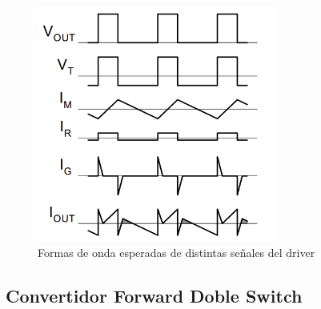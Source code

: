 \begin{figure}[H]
    \centering
    \includegraphics[width=0.7\textwidth]{images/driver_expected_waveforms.png}
    \caption{Formas de onda esperadas de distintas señales del driver \cite{gatedrivers}}
    \label{fig:driver_expected_waveforms}
\end{figure}













\subsection{Convertidor Forward Doble Switch}

